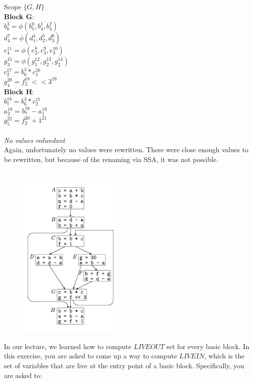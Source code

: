 \documentclass[11pt]{article}
\begin{document}
\begin{enumerate}
\begin{Answer}
		Scope $\{G, H\}$ \\
		\textbf{Block G}: \\
		$b_6^3 = \phi(b_5^0, b_4^1, b_4^2)$ \\
		$d_4^7 = \phi(d_1^4, d_2^5, d_3^6)$ \\
		$e_4^{11} = \phi(e_2^8, e_3^9, e_3^{10})$ \\
		$g_3^{15} = \phi(g_1^{12}, g_2^{13}, g_2^{14})$ \\
		$c_2^{17} = b_6^3 * c_1^{16}$ \\
		$g_4^{20} = f_2^{18} << 3^{19}$ \\
		\textbf{Block H}: \\
		$b_7^{18} = b_6^3 * c_2^{17}$ \\
		$a_2^{19} = b_7^{18} - a_1^{19}$ \\
		$g_5^{22} = f_2^{20} + 1^{21}$ \\
		\\
		\textit{No values redundant} \\
		
		Again, unfortunately no values were rewritten. There were close enough values to be rewritten, but because of the renaming via SSA, it was not possible.
		\end{Answer}
\end{enumerate}

\newpage
\section{}
\begin{figure}[H]
    \centerline{\includegraphics[width=2in]{figures/hw1_cfg2.png}}
\end{figure}
In our lecture, we learned how to compute $LIVEOUT$ set for every basic block. In this exercise, you are asked to come up a way to compute $LIVEIN$, which is the set of variables that are live at the entry point of a basic block. Specifically, you are asked to:
\end{document}
